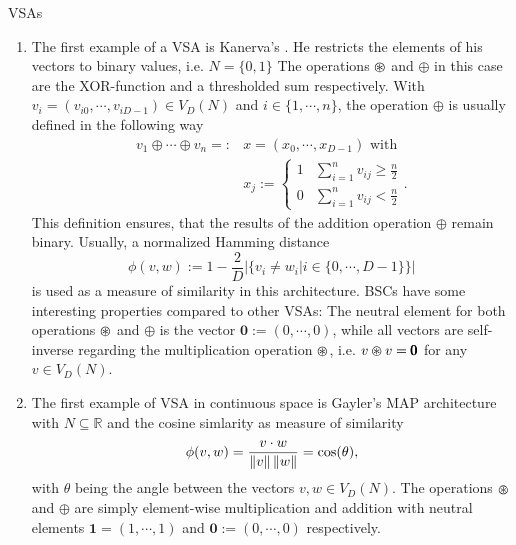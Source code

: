 \begin{ex} \aclp{VSA}
	\label{ex:VSAs}
	\begin{enumerate}
		\item The first example of a \ac{VSA} is Kanerva's  \cite{Kanerva2009}. 
		He restricts the elements of his vectors to binary values, i.e. $N=\{0,1\}$
		The operations $\varoast$ and $\oplus$ in this case are the XOR-function and a thresholded sum respectively.
		With $v_{i} = \left(v_{i 0}, \cdots, v_{i D-1}\right) \in V_{D}(N)$ and  $i \in \{1, \cdots, n\}$, the operation $\oplus$ is usually defined in the following way
		\begin{align*}
		v_{1} \oplus \cdots \oplus v_{n} =: &x = \left(x_{0}, \cdots, x_{D-1}\right) \textrm{ with } \\
		&x_{j}:= \begin{cases}
		1 & \sum\limits_{i=1}^{n} v_{ij} \geq \frac{n}{2} \\
		0 & \sum\limits_{i=1}^{n} v_{ij} < \frac{n}{2}
		\end{cases}.
		\end{align*}
		This definition ensures, that the results of the addition operation $\oplus$ remain binary.
		Usually, a normalized Hamming distance 
		\[
		\phi(v,w) := 1 - \frac{2}{D} \left| \{ v_{i} \neq w_{i} | i \in \{0, \cdots, D-1\} \} \right|
		\]
		is used as a measure of similarity in this architecture.
		\acp{BSC} have some interesting properties compared to other \acp{VSA}: 
		The neutral element for both operations $\varoast$ and $\oplus$ is the vector $\pmb{0} := \left(0, \cdots, 0\right)$, while all vectors are self-inverse regarding the multiplication operation $\varoast$, i.e. $v \varoast v = \pmb{0}$ for any $v \in V_{D}(N)$.
		
		\item The first example of \ac{VSA} in continuous space is Gayler's \acrfull{MAP} architecture \cite{Gayler1998} with $N \subseteq \mathbb{R}$ and the cosine simlarity as measure of similarity 
		\[
		\phi(v,w) = \frac{v \cdot w}{\left\| v \right\|\left\| w \right\|}=\cos(\theta),
		\]
		with $\theta$ being the angle between the vectors $v,w \in V_{D}(N)$.
		The operations $\varoast$ and $\oplus$ are simply element-wise multiplication and addition with neutral elements $\pmb{1}=\left(1, \cdots, 1\right)$ and $\pmb{0} := \left(0, \cdots, 0\right)$ respectively.
		

\end{enumerate}
\end{ex}
